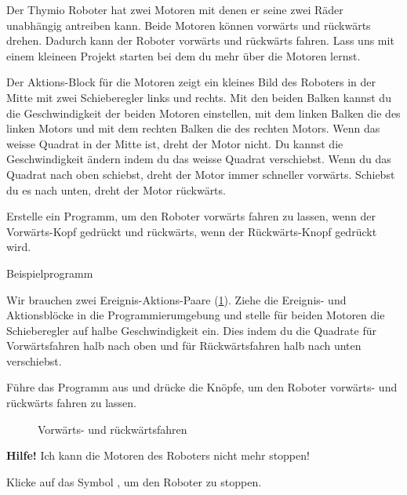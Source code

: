 \label{c.moving}


Der Thymio Roboter hat zwei Motoren mit denen er seine zwei Räder unabhängig antreiben
kann. Beide Motoren können vorwärts und rückwärts drehen. Dadurch kann der
Roboter vorwärts und rückwärts fahren. Lass uns mit einem kleineen Projekt starten bei dem du mehr über die Motoren lernst.

Der Aktions-Block für die Motoren  zeigt ein kleines Bild
des Roboters in der Mitte mit zwei Schieberegler links und rechts. Mit den beiden Balken kannst du die
Geschwindigkeit der beiden Motoren einstellen, mit dem linken Balken die des
linken Motors und mit dem rechten Balken die des rechten Motors. Wenn das
weisse Quadrat in der Mitte ist, dreht der Motor nicht. 
Du kannst die Geschwindigkeit ändern indem du das weisse Quadrat verschiebst.
Wenn du das Quadrat
nach oben schiebst, dreht der Motor immer schneller vorwärts. Schiebst du es
nach unten, dreht der Motor rückwärts.

Erstelle ein Programm, um den Roboter vorwärts fahren zu lassen, wenn der
Vorwärts-Kopf gedrückt und rückwärts, wenn der Rückwärts-Knopf gedrückt
wird.

{\raggedleft \hfill Beispielprogramm }

Wir brauchen zwei Ereignis-Aktions-Paare (\cref{fig.nostop}). 
Ziehe die Ereignis- und Aktionsblöcke in die Programmierumgebung und stelle für beiden Motoren die Schieberegler auf halbe Geschwindigkeit ein. Dies indem du die Quadrate für Vorwärtsfahren halb nach oben und für Rückwärtsfahren halb nach unten verschiebst.

Führe das Programm aus und drücke die Knöpfe, um den Roboter vorwärts- und rückwärts fahren zu lassen. 


\begin{figure}
\begin{center}
\vspace{-1em}
\caption{Vorwärts- und rückwärtsfahren}\label{fig.nostop}
\end{center}
\end{figure}


\newpage


\textbf{Hilfe!} Ich kann die Motoren des Roboters nicht mehr stoppen!

Klicke auf das Symbol , um den Roboter zu stoppen.

